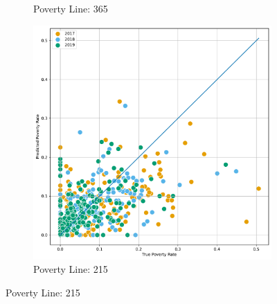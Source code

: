 \begin{figure}[H]
\begin{subfigure}[b]{0.47\textwidth}
             \caption{Poverty Line: 365}
         \end{subfigure} 
          \hfill
         \begin{subfigure}[b]{0.47\textwidth}
             \centering
             \includegraphics[width=\textwidth]{../figures/fig4_2_prediction_vs_true_poverty_rate_provincia_p215_scatter.pdf}
             \caption{Poverty Line: 215}
         \end{subfigure} 
\end{figure}




